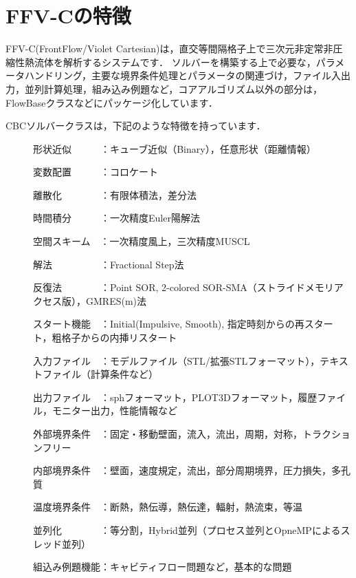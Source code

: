 \graphicspath{{./fig_intro/}}


%
\section{FFV-Cの特徴}
FFV-C(FrontFlow/Violet Cartesian)は，直交等間隔格子上で三次元非定常非圧縮性熱流体を解析するシステムです．
ソルバーを構築する上で必要な，パラメータハンドリング，主要な境界条件処理とパラメータの関連づけ，ファイル入出力，並列計算処理，組み込み例題など，コアアルゴリズム以外の部分は，FlowBaseクラスなどにパッケージ化しています．

CBCソルバークラスは，下記のような特徴を持っています．

\begin{description}
\item[ ] 形状近似　　　：キューブ近似（Binary），任意形状（距離情報）
\item[ ] 変数配置　　　：コロケート
\item[ ] 離散化　　　　：有限体積法，差分法
\item[ ] 時間積分　　　：一次精度Euler陽解法%
\item[ ] 空間スキーム　：一次精度風上，三次精度MUSCL%
\item[ ] 解法　　　　　：Fractional Step法
\item[ ] 反復法　　　　：Point SOR, 2-colored SOR-SMA（ストライドメモリアクセス版），GMRES(m)法
\item[ ] スタート機能　：Initial(Impulsive, Smooth), 指定時刻からの再スタート，粗格子からの内挿リスタート
\item[ ] 入力ファイル　：モデルファイル（STL/拡張STLフォーマット），テキストファイル（計算条件など）
\item[ ] 出力ファイル　：sphフォーマット，PLOT3Dフォーマット，履歴ファイル，モニター出力，性能情報など
\item[ ] 外部境界条件　：固定・移動壁面，流入，流出，周期，対称，トラクションフリー
\item[ ] 内部境界条件　：壁面，速度規定，流出，部分周期境界，圧力損失，多孔質
\item[ ] 温度境界条件　：断熱，熱伝導，熱伝達，輻射，熱流束，等温
\item[ ] 並列化　　　　：等分割，Hybrid並列（プロセス並列とOpneMPによるスレッド並列）
\item[ ] 組込み例題機能：キャビティフロー問題など，基本的な問題

\end{description}
